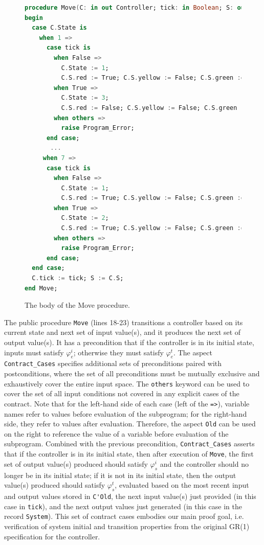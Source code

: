 \documentclass[runningheads]{llncs}
\begin{document}
\begin{figure}
\begin{lstlisting}[language={Ada}, basicstyle=\scriptsize]  
procedure Move(C: in out Controller; tick: in Boolean; S: out System) is
begin
  case C.State is
    when 1 =>
      case tick is
        when False =>
          C.State := 1; 
          C.S.red := True; C.S.yellow := False; C.S.green := False;
        when True =>
          C.State := 3; 
          C.S.red := False; C.S.yellow := False; C.S.green := True;
        when others =>
          raise Program_Error;
      end case;
       ...      
     when 7 =>
      case tick is
        when False =>
          C.State := 1; 
          C.S.red := True; C.S.yellow := False; C.S.green := False;
        when True => 
          C.State := 2; 
          C.S.red := True; C.S.yellow := False; C.S.green := False;
        when others =>
          raise Program_Error;
      end case;
  end case;
  C.tick := tick; S := C.S;
end Move;
\end{lstlisting}
  \caption{The body of the Move procedure.}
  \label{fig:moveBody}
\end{figure}

The public procedure \lstinline{Move} (lines 18-23) transitions a controller based on its current state and 
next set of input value(s), and it produces the next set of output value(s). 
It has a precondition that if the controller is in its initial state, 
inputs must satisfy $\varphi_e^i$; otherwise they must satisfy $\varphi_e^t$.
The aspect \lstinline{Contract_Cases} specifies additional sets of preconditions paired with postconditions, 
where the set of all preconditions must be mutually exclusive and exhaustively cover the entire input space.
The \lstinline{others} keyword can be used to cover the set of all input conditions not covered in any explicit cases of the contract. 
Note that for the left-hand side of each case (left of the \lstinline{=>}), variable names refer to values before evaluation of the subprogram; 
for the right-hand side, they refer to values after evaluation.
Therefore, the aspect \lstinline{Old} can be used on the right to reference the value of a variable before evaluation of the subprogram. 
Combined with the previous precondition, \lstinline{Contract_Cases} asserts that if the controller is in its initial state, then after execution of \lstinline{Move}, 
the first set of output value(s) produced should satisfy $\varphi_s^i$ and the controller should no longer be in its initial state; 
if it is not in its initial state, then the output value(s) produced should satisfy $\varphi_s^t$, 
evaluated based on the most recent input and output values stored in \lstinline{C'Old}, the next input value(s) just provided (in this case in \lstinline{tick}), 
and the next output values just generated (in this case in the record \lstinline{System}). 
This set of contract cases embodies our main proof goal, i.e. verification of system initial and transition properties from the original GR(1) specification for the controller. 
\end{document}
